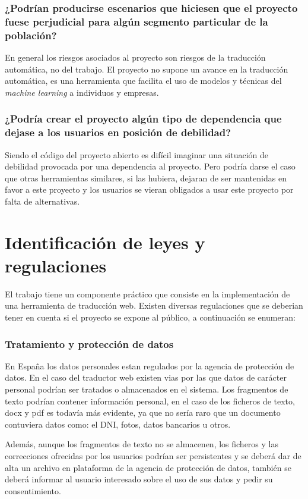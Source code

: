 \subsubsection{¿Podrían producirse escenarios que hiciesen que el proyecto fuese perjudicial para algún segmento particular de la población?}

En general los riesgos asociados al proyecto son riesgos de la traducción automática, no del trabajo. El proyecto no supone un avance en la traducción automática, es una herramienta que facilita el uso de modelos y técnicas del \textit{machine learning} a individuos y empresas.

\subsubsection{¿Podría crear el proyecto algún tipo de dependencia que dejase a los usuarios en posición de debilidad?}

Siendo el código del proyecto abierto es difícil imaginar una situación de debilidad provocada por una dependencia al proyecto. Pero podría darse el caso que otras herramientas similares, si las hubiera, dejaran de ser mantenidas en favor a este proyecto y los usuarios se vieran obligados a usar este proyecto por falta de alternativas.

\section{Identificación de leyes y regulaciones}
El trabajo tiene un componente práctico que consiste en la implementación de una herramienta de traducción web.
Existen diversas regulaciones que se deberian tener en cuenta si el proyecto se expone al público, a continuación se enumeran:
\subsubsection{Tratamiento y protección de datos}
En España los datos personales estan regulados por la agencia de protección de datos. En el caso del traductor web existen vias por las que datos de carácter personal podrían ser tratados o almacenados en el sistema. Los fragmentos de texto podrían contener información personal, en el caso de los ficheros de texto, docx y pdf es todavía más evidente, ya que no sería raro que un documento contuviera datos como: el DNI, fotos, datos bancarios u otros.

Además, aunque los fragmentos de texto no se almacenen, los ficheros y las correcciones ofrecidas por los usuarios podrían ser persistentes y se deberá dar de alta un archivo en plataforma de la agencia de protección de datos, también se deberá informar al usuario interesado sobre el uso de sus datos y pedir su consentimiento.

